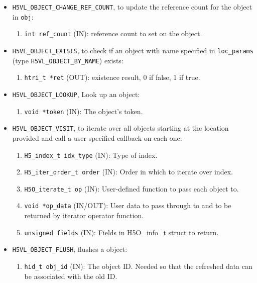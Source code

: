 \begin{itemize}
\item \texttt{H5VL\_OBJECT\_CHANGE\_REF\_COUNT}, to update the reference
  count for the object in \texttt{obj}:
  \begin{enumerate}
  \item \texttt{int ref\_count} (IN): reference count to set on the object.
  \end{enumerate}

\item \texttt{H5VL\_OBJECT\_EXISTS}, to check if an object with name
  specified in \texttt{loc\_params} (type \texttt{H5VL\_OBJECT\_BY\_NAME})
  exists:
  \begin{enumerate}
  \item \texttt{htri\_t *ret} (OUT): existence result, 0 if false, 1 if true.
  \end{enumerate}

\item \texttt{H5VL\_OBJECT\_LOOKUP}, Look up an object:
  \begin{enumerate}
  \item \texttt{void *token} (IN): The object's token.\\
  \end{enumerate}

\item \texttt{H5VL\_OBJECT\_VISIT}, to iterate over all objects starting at the location provided and call a user-specified callback on each one:
  \begin{enumerate}
  \item \texttt{H5\_index\_t idx\_type} (IN): Type of index.\\
  \item \texttt{H5\_iter\_order\_t order} (IN): Order in which to iterate over index.\\
  \item \texttt{H5O\_iterate\_t op} (IN): User-defined function to pass each object to. \\
  \item \texttt{void *op\_data} (IN/OUT): User data to pass through to and to be returned by iterator operator function. \\
  \item \texttt{unsigned fields} (IN): Fields in H5O\_info\_t struct to return. \\
  \end{enumerate}
  
\item \texttt{H5VL\_OBJECT\_FLUSH}, flushes a object:
  \begin{enumerate}
  \item \texttt{hid\_t obj\_id} (IN): The object ID. Needed so that the refreshed data can be associated with the old ID. 
  \end{enumerate}


\end{itemize}
